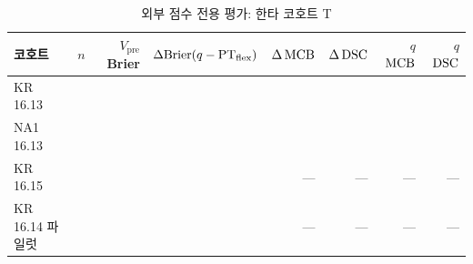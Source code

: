 \begin{table}[!t]
  \centering
  \caption{외부 점수 전용 평가: 한타 코호트 T}
  \label{tab:ext-T}
  \small
  \begin{tabular}{@{}lrrrrrrr@{}}
    \toprule
    코호트 & $n$ & $V_{\mathrm{pre}}$ Brier & $\Delta\mathrm{Brier}(q - \mathrm{PT}_{\mathrm{flex}})$ & $\Delta\operatorname{MCB}$ & $\Delta\operatorname{DSC}$ & $q$ $\operatorname{MCB}$ & $q$ $\operatorname{DSC}$ \\
    \midrule
    KR 16.13 & \numTExtKR{} & \extTKRVpre{} & \textbf{\extTKRdBrier{}} & \extTKRdMCB{} & \extTKRdDSC{} & \extTKRqMCB{} & \extTKRqDSC{} \\
    NA1 16.13 & \numTExtNA{} & \extTNAVpre{} & \textbf{\extTNAdBrier{}} & \extTNAdMCB{} & \extTNAdDSC{} & \extTNAqMCB{} & \extTNAqDSC{} \\
    KR 16.15 & \numTExtKRb{} & \extTKRbVpre{} & \extTKRbdBrier{} & --- & --- & --- & --- \\
    KR 16.14 파일럿 & \numTExtPilot{} & \extTPilotVpre{} & \extTPilotdBrier{} & --- & --- & --- & --- \\
    \bottomrule
  \end{tabular}
\end{table}
